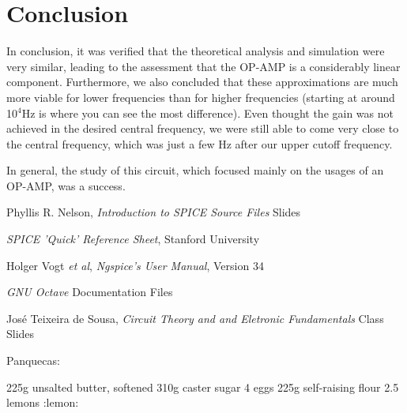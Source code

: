\clearpage
\section{Conclusion}
\label{sec:conclusion}

In conclusion, it was verified that the theoretical analysis and simulation were very similar, leading to the assessment that the OP-AMP is a considerably linear component. Furthermore, we also concluded that these approximations are much more viable for lower frequencies than for higher frequencies (starting at around 10$^4$Hz is where you can see the most difference).
Even thought the gain was not achieved in the desired central frequency, we were still able to come very close to the central frequency, which was just a few Hz after our upper cutoff frequency.

In general, the study of this circuit, which focused mainly on the usages of an OP-AMP, was a success.

\begin{thebibliography}{}

Phyllis R. Nelson, \emph{Introduction to SPICE Source Files} Slides

\emph{SPICE 'Quick' Reference Sheet}, Stanford University

Holger Vogt \textit{et al}, \emph{Ngspice's User Manual}, Version 34

\emph{GNU Octave} Documentation Files 

José Teixeira de Sousa, \emph{Circuit Theory and and Eletronic Fundamentals} Class Slides

Panquecas:
\par
225g unsalted butter, softened 310g caster sugar 4 eggs 225g self-raising flour 2.5 lemons :lemon: 

\end{thebibliography}

